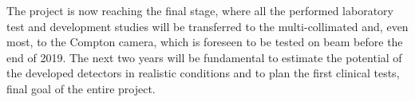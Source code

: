 The project is now reaching the final stage, where all the performed laboratory test and development studies will be transferred to the multi-collimated and, even most, to the Compton camera, which is foreseen to be tested on beam before the end of 2019. The next two years will be fundamental to estimate the potential of the developed detectors in realistic conditions and to plan the first clinical tests, final goal of the entire project. 

\clearpage
